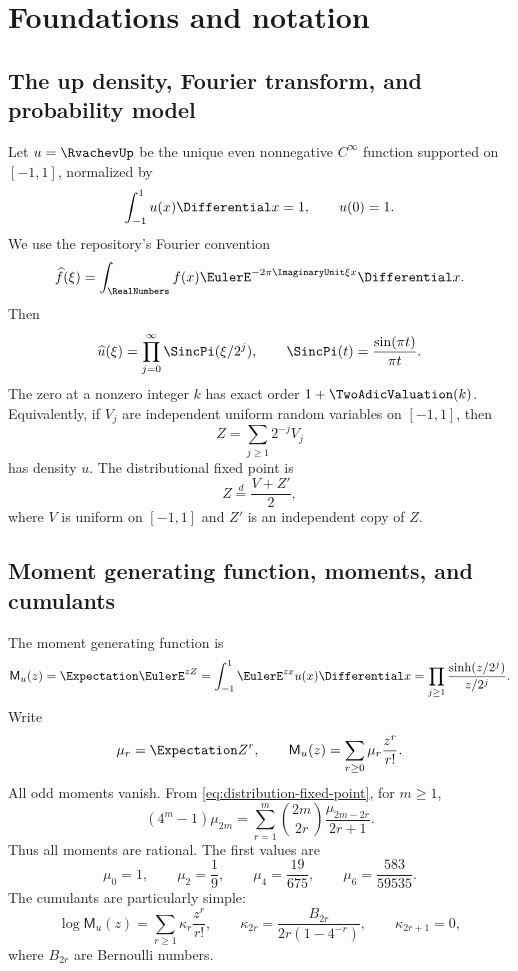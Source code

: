 \documentclass[11pt,oneside]{article}
\numberwithin{equation}{section}
\theoremstyle{definition}
\theoremstyle{remark}
\newcommand{\MM}{\mathsf M}
\begin{document}
\section{Foundations and notation}
\label{sec:foundations}

\subsection{The up density, Fourier transform, and probability model}

Let $u=\RvachevUp$ be the unique even nonnegative $C^\infty$ function supported on
$[-1,1]$, normalized by
\[
 \int_{-1}^{1}u(x)\Differential x=1,
 \qquad u(0)=1.
\]
We use the repository's Fourier convention
\[
 \widehat f(\xi)=\int_{\RealNumbers}f(x)\EulerE^{-2\pi\ImaginaryUnit\xi x}\Differential x.
\]
Then
\begin{equation}
 \widehat u(\xi)=\prod_{j=0}^{\infty}\SincPi(\xi/2^j),
 \qquad
 \SincPi(t)=\frac{\sin(\pi t)}{\pi t}.
 \label{eq:fourier-product}
\end{equation}
The zero at a nonzero integer $k$ has exact order $1+\TwoAdicValuation(k)$.
Equivalently, if $V_j$ are independent uniform random variables on $[-1,1]$,
then
\begin{equation}
 Z=\sum_{j\ge1}2^{-j}V_j
 \label{eq:probability-Z}
\end{equation}
has density $u$.  The distributional fixed point is
\begin{equation}
 Z\overset{d}=\frac{V+Z'}2,
 \label{eq:distribution-fixed-point}
\end{equation}
where $V$ is uniform on $[-1,1]$ and $Z'$ is an independent copy of $Z$.

\subsection{Moment generating function, moments, and cumulants}

The moment generating function is
\begin{equation}
 \MM_u(z)=\Expectation\EulerE^{zZ}
 =\int_{-1}^{1}\EulerE^{zx}u(x)\Differential x
 =\prod_{j\ge1}\frac{\sinh(z/2^j)}{z/2^j}.
 \label{eq:mgf}
\end{equation}
Write
\[
 \mu_r=\Expectation Z^r,
 \qquad
 \MM_u(z)=\sum_{r\ge0}\mu_r\frac{z^r}{r!}.
\]
All odd moments vanish.  From \eqref{eq:distribution-fixed-point}, for $m\ge1$,
\begin{equation}
 (4^m-1)\mu_{2m}
 =\sum_{r=1}^{m}\binom{2m}{2r}
   \frac{\mu_{2m-2r}}{2r+1}.
 \label{eq:moment-recurrence}
\end{equation}
Thus all moments are rational.  The first values are
\[
 \mu_0=1,
 \qquad \mu_2=\frac19,
 \qquad \mu_4=\frac{19}{675},
 \qquad \mu_6=\frac{583}{59535}.
\]
The cumulants are particularly simple:
\begin{equation}
 \log\MM_u(z)=\sum_{r\ge1}\kappa_r\frac{z^r}{r!},
 \qquad
 \kappa_{2r}=\frac{B_{2r}}{2r(1-4^{-r})},
 \qquad \kappa_{2r+1}=0,
 \label{eq:cumulants}
\end{equation}
where $B_{2r}$ are Bernoulli numbers.
\end{document}

